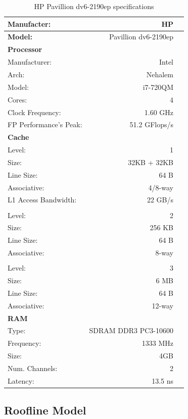 \documentclass[a4paper,10pt,openright,openbib,twocolumn]{article}
\begin{document}
\begin{table}[!htp]
	\footnotesize
		\begin{tabular}{lrl}
			\hline 
			\textbf{Manufacter:} & HP \\
			\hline 
			\textbf{Model:} & Pavillion dv6-2190ep \\
			\hline 
			\textbf{Processor} & & \\
			Manufacturer: & Intel & \\
			Arch: & Nehalem & \\
			Model: & i7-720QM & \\
			Cores: & 4 & \\
			Clock Frequency: & 1.60 GHz & \\
			FP Performance's Peak: & 51.2 GFlops/s & \\
			\hline 
			\textbf{Cache} & & \\
			Level: & 1 & \\
			Size: & 32KB + 32KB & \\
			Line Size: & 64 B & \\
			Associative: & 4/8-way & \\
			L1 Access Bandwidth: & 22 GB/s & \\
			\\
			Level: & 2 & \\
			Size: & 256 KB & \\
			Line Size: & 64 B & \\
			Associative: & 8-way & \\
			\\
			Level: & 3 & \\
			Size: & 6 MB & \\
			Line Size: & 64 B & \\
			Associative: & 12-way & \\
			\hline 
			\textbf{RAM} \\
			Type: & SDRAM DDR3 PC3-10600 & \\
			Frequency: & 1333 MHz & \\
			Size: & 4GB & \\
			Num. Channels: & 2 & \\
			Latency: & 13.5 ns & \\
		\end{tabular}
		\caption{HP Pavillion dv6-2190ep specifications}
		\label{tab:hp}
\end{table}


\subsection{Roofline Model}
\end{document}

